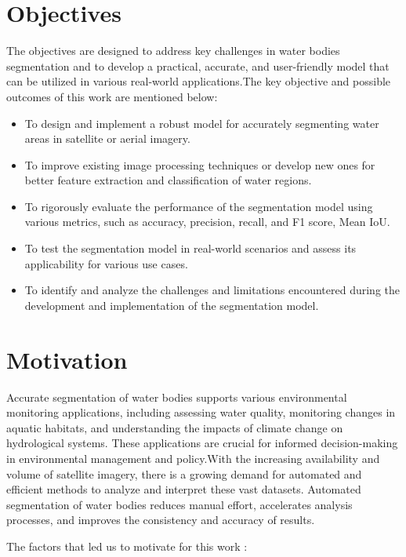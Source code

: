 \section{Objectives}
The objectives are designed to address key challenges in water bodies segmentation and to develop a practical, accurate, and user-friendly model that can be utilized in various real-world applications.The key objective and possible outcomes of this work are mentioned below:
\begin{itemize}
    \item To design and implement a robust model for accurately segmenting water areas in satellite or aerial imagery.
    \item To improve existing image processing techniques or develop new ones for better feature extraction and classification of water regions.
    \item  To rigorously evaluate the performance of the segmentation model using various metrics, such as accuracy, precision, recall, and F1 score, Mean IoU.
    \item  To test the segmentation model in real-world scenarios and assess its applicability for various use cases.
    \item  To identify and analyze the challenges and limitations encountered during the development and implementation of the segmentation model.
\end{itemize}

\section{Motivation}
Accurate segmentation of water bodies supports various environmental monitoring applications, including assessing water quality, monitoring changes in aquatic habitats, and understanding the impacts of climate change on hydrological systems. These applications are crucial for informed decision-making in environmental management and policy.With the increasing availability and volume of satellite imagery, there is a growing demand for automated and efficient methods to analyze and interpret these vast datasets. Automated segmentation of water bodies reduces manual effort, accelerates analysis processes, and improves the consistency and accuracy of results.

The factors that led us to motivate for this work :

